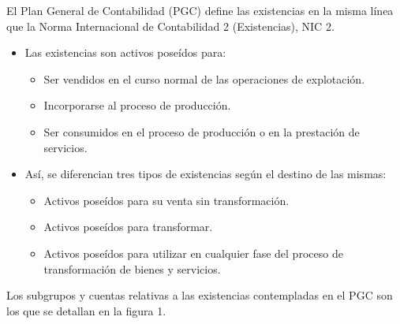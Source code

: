\documentclass{article}
\begin{document}
El Plan General de Contabilidad (PGC) define las existencias en la misma línea que la Norma Internacional de Contabilidad 2 (Existencias), NIC 2.

\begin{itemize}
    \item Las existencias son activos poseídos para:
    \begin{itemize}
        \item Ser vendidos en el curso normal de las operaciones de explotación.
        \item Incorporarse al proceso de producción.
        \item Ser consumidos en el proceso de producción o en la prestación de servicios.
    \end{itemize}
    \item Así, se diferencian tres tipos de existencias según el destino de las mismas:
    \begin{itemize}
        \item Activos poseídos para su venta sin transformación.
        \item Activos poseídos para transformar.
        \item Activos poseídos para utilizar en cualquier fase del proceso de transformación de bienes y servicios.
    \end{itemize}
\end{itemize}


Los subgrupos y cuentas relativas a las existencias contempladas en el PGC son los que se detallan en la figura 1.
\end{document}
